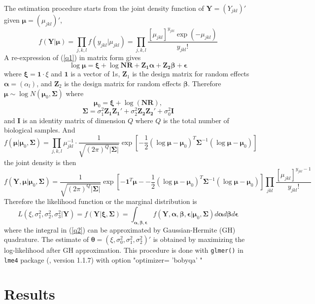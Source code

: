 \documentclass[11pt, a4paper]{article}
\begin{document}
The estimation procedure starts from the joint density function of $\bm Y=(Y_{jkl})'$ given $\bm \mu= (\mu_{jkl})'$, 
  \[f(\bm Y|\bm \mu )=\prod_{ j, k,l}f(y_{jkl}|\mu_{jkl})=\prod_{j,k,l}\frac{[\mu_{jkl}]^{y_{jkl}}\exp(-\mu_{jkl})}{y_{jkl}!}\]
A re-expression of  (\ref{q1}) in matrix form gives 
\[\log\bm \mu= \bm \xi + \log{\bm{NR}} + \bm {Z_1\alpha} + \bm{Z_2\beta} + \bm \epsilon \]
where $\bm \xi = \bm 1\cdot\xi$ and $\bm 1$ is a vector of 1s, $\bm Z_1$ is the design matrix for random effects $\bm \alpha=(\alpha_l)$, and $\bm Z_2$ is the design matrix for random effects $\bm \beta $. 
Therefore  $\bm\mu  \sim \log N(\bm \mu_0, \bm \Sigma)$ where 
$$\bm \mu_0 =\bm\xi + \log(\bm {NR}),$$ 
$$\bm \Sigma = \sigma_1^2\bm {Z_1Z_1'} + \sigma_2^2\bm {Z_2 Z_2'} +\sigma_0^2 \bm I$$
and $\bm I$ is an identity matrix of dimension $Q$ where $Q$ is the total number of biological samples. 
 And 
 \[f(\bm \mu |\bm \mu_0, \bm \Sigma)=\prod_{j,k,l} \mu_{jkl}^{-1}\cdot \frac{1}{ \sqrt{(2\pi)^Q|\bm\Sigma|}}\exp[-\frac{1}{2} {(\log\bm \mu - \bm \mu_0)^T\bm \Sigma^{-1}(\log\bm \mu - \bm \mu_0)}]\]
 the joint density is then
  \[f(\bm Y, \bm \mu |\bm \mu_0, \bm \Sigma) =\frac{1}{\sqrt{(2\pi)^Q|\bm \Sigma|}}\exp[-\bm 1^T\bm \mu - -\frac{1}{2} {(\log\bm \mu - \bm \mu_0)^T\bm \Sigma^{-1}(\log\bm \mu - \bm \mu_0)}]\prod_{jkl}\frac{[\mu_{jkl}]^{y_{jkl}-1}}{y_{jkl}!}\]
   Therefore the likelihood function or the marginal distribution is 
   \begin{equation}\label{q2}
   L(\xi, \sigma_1^2, \sigma_2^2, \sigma_3^2|\bm Y)=f(\bm Y|\bm \xi, \bm \Sigma)= \int_{\bm{\alpha,\beta,\epsilon}} f(\bm Y, \bm \alpha, \bm \beta, \bm \epsilon |\bm \mu_0, \bm \Sigma)d\bm \alpha d \bm\beta d\bm \epsilon 
   \end{equation}
where the integral in (\ref{q2}) can be approximated by Gaussian-Hermite (GH) quadrature. The estimate of $\bm\theta = (\xi, \sigma_0^2, \sigma_1^2, \sigma_2^2)'$ is obtained by maximizing the log-likelihood after GH approximation.  This procedure is done with \verb"glmer()"  in \verb"lme4"  package (\cite{bates2012lme4}, version 1.1.7)  with option  "optimizer= 'bobyqa' " 
 
 \section{Results}
 
\end{document}

